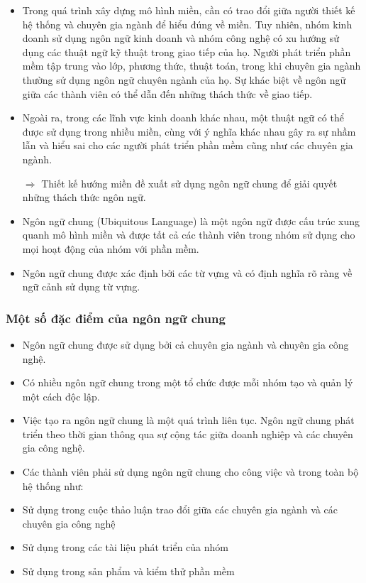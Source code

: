 \begin{itemize}

\item Trong quá trình xây dựng mô hình miền, cần có trao đổi giữa người thiết kế hệ thống và chuyên gia ngành để hiểu đúng về miền. Tuy nhiên, nhóm kinh doanh sử dụng ngôn ngữ kinh doanh và nhóm công nghệ có xu hướng sử dụng các thuật ngữ kỹ thuật trong giao tiếp của họ. Người phát triển phần mềm tập trung vào lớp, phương thức, thuật toán, trong khi chuyên gia ngành thường sử dụng ngôn ngữ chuyên ngành của họ. Sự khác biệt về ngôn ngữ giữa các thành viên có thể dẫn đến những thách thức về giao tiếp.

\item Ngoài ra, trong các lĩnh vực kinh doanh khác nhau, một thuật ngữ có thể được sử dụng trong nhiều miền, cùng với ý nghĩa khác nhau gây ra sự nhầm lẫn và hiểu sai cho các người phát triển phần mềm cũng như các chuyên gia ngành.

$\Rightarrow$ Thiết kế hướng miền đề xuất sử dụng ngôn ngữ chung để giải quyết những thách thức ngôn ngữ.

\item Ngôn ngữ chung (Ubiquitous Language) là một ngôn ngữ được cấu trúc xung quanh mô hình miền và được tất cả các thành viên trong nhóm sử dụng cho mọi hoạt động của nhóm với phần mềm.

\item Ngôn ngữ chung được xác định bởi các từ vựng và có định nghĩa rõ ràng về ngữ cảnh sử dụng từ vựng.

\end{itemize}

\subsubsection{Một số đặc điểm của ngôn ngữ chung}

\begin{itemize}

\item Ngôn ngữ chung được sử dụng bởi cả chuyên gia ngành và chuyên gia công nghệ.

\item Có nhiều ngôn ngữ chung trong một tổ chức được mỗi nhóm tạo và quản lý một cách độc lập.

\item Việc tạo ra ngôn ngữ chung là một quá trình liên tục. Ngôn ngữ chung phát triển theo thời gian thông qua sự cộng tác giữa doanh nghiệp và các chuyên gia công nghệ.

\item Các thành viên phải sử dụng ngôn ngữ chung cho công việc và trong toàn bộ hệ thống như:

\item Sử dụng trong cuộc thảo luận trao đổi giữa các chuyên gia ngành và các chuyên gia công nghệ

\item Sử dụng trong các tài liệu phát triển của nhóm

\item Sử dụng trong sản phẩm và kiểm thử phần mềm

\end{itemize}



